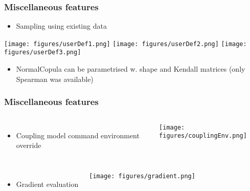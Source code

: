 \documentclass[aspectratio=169]{beamer}
\begin{document}

\begin{frame}
  \frametitle{Miscellaneous features}
   \begin{itemize}
   \item Sampling using existing data
   \end{itemize}
   \begin{center}
     \texttt{[image: figures/userDef1.png]} \texttt{[image: figures/userDef2.png]} \texttt{[image: figures/userDef3.png]}
   \end{center}
   \begin{itemize}
   \item NormalCopula can be parametrised w. shape and Kendall matrices (only Spearman was available)
   \end{itemize}


%
\end{frame}


\begin{frame}
  \frametitle{Miscellaneous features}
  \begin{columns}
    \begin{itemize}
    \item Coupling model command environment override
    \end{itemize}
    \begin{center}
      \texttt{[image: figures/couplingEnv.png]}
    \end{center}
  \end{columns}

  \begin{columns}
    \begin{itemize}
    \item Gradient evaluation
    \end{itemize}
    \begin{center}
      \texttt{[image: figures/gradient.png]}
    \end{center}
  \end{columns}
\end{frame}
\end{document}
